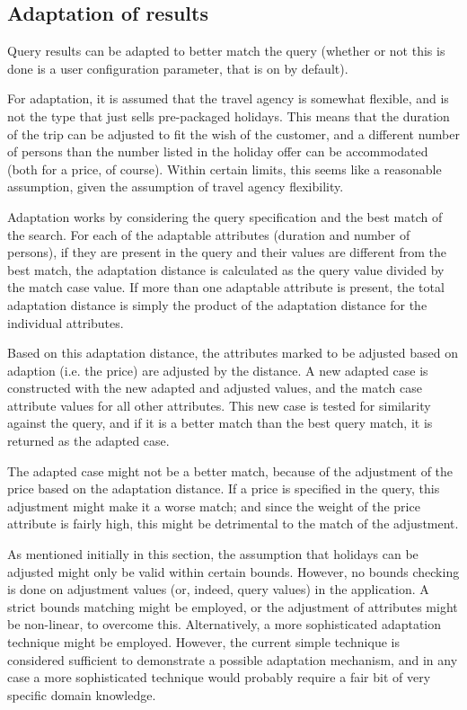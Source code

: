 \documentclass[11pt]{article}
\begin{document}
\subsection{Adaptation of results}
Query results can be adapted to better match the query (whether or not
this is done is a user configuration parameter, that is on by
default).

For adaptation, it is assumed that the travel agency is somewhat
flexible, and is not the type that just sells pre-packaged holidays.
This means that the duration of the trip can be adjusted to fit the
wish of the customer, and a different number of persons than the
number listed in the holiday offer can be accommodated (both for a
price, of course). Within certain limits, this seems like a reasonable
assumption, given the assumption of travel agency flexibility.

Adaptation works by considering the query specification and the best
match of the search. For each of the adaptable attributes (duration
and number of persons), if they are present in the query and their
values are different from the best match, the adaptation distance is
calculated as the query value divided by the match case value. If more
than one adaptable attribute is present, the total adaptation distance
is simply the product of the adaptation distance for the individual
attributes.

Based on this adaptation distance, the attributes marked to be
adjusted based on adaption (i.e. the price) are adjusted by the
distance. A new adapted case is constructed with the new adapted and
adjusted values, and the match case attribute values for all other
attributes. This new case is tested for similarity against the query,
and if it is a better match than the best query match, it is returned
as the adapted case.

The adapted case might not be a better match, because of the
adjustment of the price based on the adaptation distance. If a price
is specified in the query, this adjustment might make it a worse
match; and since the weight of the price attribute is fairly high,
this might be detrimental to the match of the adjustment.

As mentioned initially in this section, the assumption that holidays
can be adjusted might only be valid within certain bounds. However, no
bounds checking is done on adjustment values (or, indeed, query
values) in the application. A strict bounds matching might be
employed, or the adjustment of attributes might be non-linear, to
overcome this. Alternatively, a more sophisticated adaptation
technique might be employed. However, the current simple technique is
considered sufficient to demonstrate a possible adaptation mechanism,
and in any case a more sophisticated technique would probably require
a fair bit of very specific domain knowledge.
\end{document}

